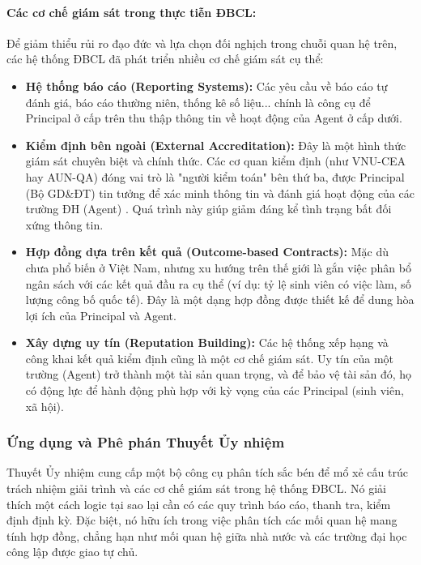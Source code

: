 \documentclass[12pt, a4paper, openany]{report}
\begin{document}
\paragraph{Các cơ chế giám sát trong thực tiễn ĐBCL:}
Để giảm thiểu rủi ro đạo đức và lựa chọn đối nghịch trong chuỗi quan hệ trên, các hệ thống ĐBCL đã phát triển nhiều cơ chế giám sát cụ thể:
\begin{itemize}
    \item \textbf{Hệ thống báo cáo (Reporting Systems):} Các yêu cầu về báo cáo tự đánh giá, báo cáo thường niên, thống kê số liệu... chính là công cụ để Principal ở cấp trên thu thập thông tin về hoạt động của Agent ở cấp dưới.
    \item \textbf{Kiểm định bên ngoài (External Accreditation):} Đây là một hình thức giám sát chuyên biệt và chính thức. Các cơ quan kiểm định (như VNU-CEA hay AUN-QA) đóng vai trò là "người kiểm toán" bên thứ ba, được Principal (Bộ GD\&ĐT) tin tưởng để xác minh thông tin và đánh giá hoạt động của các trường ĐH (Agent) \cite{Borgos2013}. Quá trình này giúp giảm đáng kể tình trạng bất đối xứng thông tin.
    \item \textbf{Hợp đồng dựa trên kết quả (Outcome-based Contracts):} Mặc dù chưa phổ biến ở Việt Nam, nhưng xu hướng trên thế giới là gắn việc phân bổ ngân sách với các kết quả đầu ra cụ thể (ví dụ: tỷ lệ sinh viên có việc làm, số lượng công bố quốc tế). Đây là một dạng hợp đồng được thiết kế để dung hòa lợi ích của Principal và Agent.
    \item \textbf{Xây dựng uy tín (Reputation Building):} Các hệ thống xếp hạng và công khai kết quả kiểm định cũng là một cơ chế giám sát. Uy tín của một trường (Agent) trở thành một tài sản quan trọng, và để bảo vệ tài sản đó, họ có động lực để hành động phù hợp với kỳ vọng của các Principal (sinh viên, xã hội).
\end{itemize}

\subsubsection{Ứng dụng và Phê phán Thuyết Ủy nhiệm}

Thuyết Ủy nhiệm cung cấp một bộ công cụ phân tích sắc bén để mổ xẻ cấu trúc trách nhiệm giải trình và các cơ chế giám sát trong hệ thống ĐBCL. Nó giải thích một cách logic tại sao lại cần có các quy trình báo cáo, thanh tra, kiểm định định kỳ. Đặc biệt, nó hữu ích trong việc phân tích các mối quan hệ mang tính hợp đồng, chẳng hạn như mối quan hệ giữa nhà nước và các trường đại học công lập được giao tự chủ.
\end{document}
